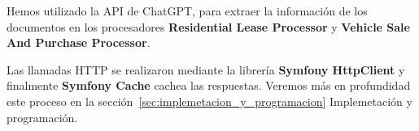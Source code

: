 Hemos utilizado la API de ChatGPT, para extraer la información de los documentos en los procesadores
\textbf{Residential Lease Processor} y \textbf{Vehicle Sale And Purchase Processor}.

Las llamadas HTTP se realizaron mediante la librería \textbf{Symfony HttpClient} y finalmente \textbf{Symfony Cache}
cachea las respuestas.
Veremos más en profundidad este proceso en la sección~\ref{sec:implemetacion_y_programacion} Implemetación y
programación.



